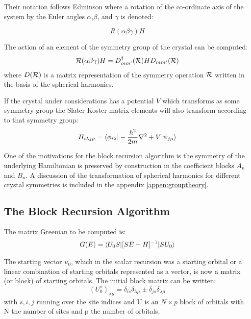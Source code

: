 Their notation follows Edminson where a rotation of the co-ordinate axis
of the system by the Euler angles $\alpha$,$\beta$, and $\gamma$ is denoted:

\begin{equation}
R(\alpha\beta\gamma)H
\end{equation}

The action of an element of the symmetry group of the crystal can be computed:
%
\begin{equation}
{\mathcal{R}}(\alpha\beta\gamma)H =  D_{mm'}^{\dagger}({\mathcal{R}})HD_{mm'}({\mathcal{R}})
\end{equation}
%
where $D({\mathcal{R}})$ is a matrix representation of the symmetry operation
${\mathcal{R}}$ written in the basis of the spherical harmonics. 

If the crystal under considerations has a potential 
$V$ which transforms as some symmetry group
the Slater-Koster matrix elements will also transform 
according to that symmetry group:
%
\begin{equation}
H_{i\lambda j\mu} = \langle \phi_{i\lambda} | -\frac{\hbar^{2}}{2m}\nabla^{2} + V|\psi_{j\mu} \rangle
\end{equation}
%

One of the motivations for the block recursion algorithm 
is the symmetry of the underlying Hamiltonian is preserved 
by construction in the coefficient blocks $A_{n}$ 
and $B_{n}$\cite{inoue87}. A discussion of the
transformation of spherical harmonics for different crystal symmetries
is included in the appendix \ref{appen:grouptheory}.

\subsection{The Block Recursion Algorithm}
\label{sec:blockrecursion}
The matrix Greenian to be computed is:
\begin{equation}
G(E) = \langle U_{0}S|[SE-H]^{-1}|SU_{0}\rangle
\end{equation}

The starting vector $u_{0}$, which in the scalar recursion
was a starting orbital or a linear combination of 
starting orbitals represented as a vector, 
is now a matrix (or block) of starting orbitals. 
The initial block matrix can be written:
%
\begin{equation}
(U^{s}_{0})_{\lambda\mu} = \delta_{is}\delta_{\lambda\mu} \pm \delta_{js}\delta_{\lambda\mu}
\end{equation}
%
with $s,i,j$ running over the site indices and 
U is an $N\times p$ block of orbitals
with N the number of sites and p the 
number of orbitals.

